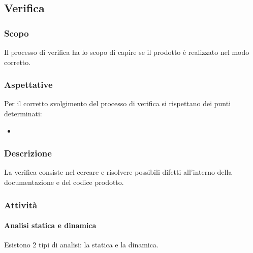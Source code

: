 \subsection{Verifica}

    \subsubsection{Scopo}
    
    Il processo di verifica ha lo scopo di capire se il prodotto è realizzato nel modo corretto.
    
    \subsubsection{Aspettative}
    
    Per il corretto svolgimento del processo di verifica si rispettano dei punti determinati:
    
    \begin{itemize}
        \item 
    \end{itemize}
    
    \subsubsection{Descrizione}
		La verifica consiste nel cercare e risolvere possibili difetti all'interno della documentazione e del codice prodotto.
    \subsubsection{Attività}
        \paragraph{Analisi statica e dinamica}
        
        Esistono 2 tipi di analisi: la statica e la dinamica.
        
